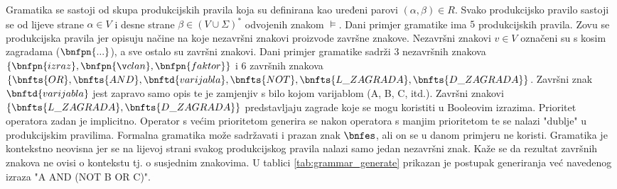 \documentclass[times, utf8, diplomski]{fer}
\begin{document}
Gramatika se sastoji od skupa produkcijskih pravila koja su definirana kao uređeni parovi $(\alpha, \beta) \in R$. Svako produkcijsko pravilo sastoji se od lijeve strane $\alpha \in V$ i desne strane $\beta \in (V \cup \Sigma)^{*}$ odvojenih znakom $\models$. Dani primjer gramatike ima $5$ produkcijskih pravila. Zovu se produkcijska pravila jer opisuju načine na koje nezavršni znakovi proizvode završne znakove. Nezavršni znakovi $v \in V$ označeni su s kosim zagradama ($\bnfpn{...}$), a sve ostalo su završni znakovi. Dani primjer gramatike sadrži $3$ nezavršnih znakova $\{ \bnfpn{izraz}, \bnfpn{član}, \bnfpn{faktor} \}$ i $6$ završnih znakova $\{ \bnfts{OR}, \bnfts{AND}, \bnftd{varijabla}, \bnfts{NOT}, \bnfts{L\_ZAGRADA}, \bnfts{D\_ZAGRADA} \}$. Završni znak $\bnftd{varijabla}$ jest zapravo samo opis te je zamjenjiv s bilo kojom varijablom (A, B, C, itd.). Završni znakovi $\{\bnfts{L\_ZAGRADA}, \bnfts{D\_ZAGRADA}\}$ predstavljaju zagrade koje se mogu koristiti u Booleovim izrazima. Prioritet operatora zadan je implicitno. Operator s većim prioritetom generira se nakon operatora s manjim prioritetom te se nalazi "dublje" u produkcijskim pravilima. Formalna gramatika može sadržavati i prazan znak $\bnfes$, ali on se u danom primjeru ne koristi. Gramatika je kontekstno neovisna jer se na lijevoj strani svakog produkcijskog pravila nalazi samo jedan nezavršni znak. Kaže se da rezultat završnih znakova ne ovisi o kontekstu tj. o susjednim znakovima. U tablici \ref{tab:grammar_generate} prikazan je postupak generiranja već navedenog izraza "A AND (NOT B OR C)".
\end{document}
